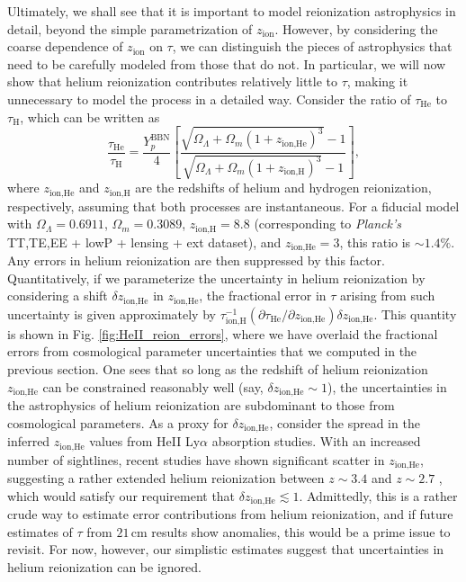 \documentclass[twocolumn,aps,prd,nofootinbib,showpacs,superscriptaddress]{revtex4-1}
\begin{document}
Ultimately, we shall see that it is important to model reionization astrophysics in detail, beyond the simple parametrization of $z_\textrm{ion}$. However, by considering the coarse dependence of $z_\textrm{ion}$ on $\tau$, we can distinguish the pieces of astrophysics that need to be carefully modeled from those that do not. In particular, we will now show that helium reionization contributes relatively little to $\tau$, making it unnecessary to model the process in a detailed way. Consider the ratio of $\tau_\textrm{He}$ to $\tau_\textrm{H}$, which can be written as
\begin{equation}
\frac{\tau_\textrm{He}}{\tau_\textrm{H}} = \frac{Y_p^\textrm{BBN}}{4} \left[ \frac{ \sqrt{\Omega_\Lambda + \Omega_m (1+z_\textrm{ion,He})^3} - 1}{ \sqrt{\Omega_\Lambda + \Omega_m (1+z_\textrm{ion,H})^3} - 1}\right],
\end{equation}
where $z_\textrm{ion,He}$ and $z_\textrm{ion,H}$ are the redshifts of helium and hydrogen reionization, respectively, assuming that both processes are instantaneous. For a fiducial model with $\Omega_\Lambda = 0.6911$, $\Omega_m = 0.3089$, $z_\textrm{ion,H} = 8.8$ (corresponding to \emph{Planck's} TT,TE,EE + lowP + lensing + ext dataset), and $z_\textrm{ion,He} = 3$, this ratio is $\sim 1.4\%$. Any errors in helium reionization are then suppressed by this factor. Quantitatively, if we parameterize the uncertainty in helium reionization by considering a shift $\delta z_\textrm{ion,He}$ in $z_\textrm{ion,He}$, the fractional error in $\tau$ arising from such uncertainty is given approximately by $\tau_\textrm{ion,H}^{-1} (\partial \tau_\textrm{He} / \partial z_\textrm{ion,He}) \delta z_\textrm{ion,He}$. This quantity is shown in Fig. \ref{fig:HeII_reion_errors}, where we have overlaid the fractional errors from cosmological parameter uncertainties that we computed in the previous section. One sees that so long as the redshift of helium reionization $z_\textrm{ion,He}$ can be constrained reasonably well (say, $ \delta z_\textrm{ion,He} \sim 1$), the uncertainties in the astrophysics of helium reionization are subdominant to those from cosmological parameters. As a proxy for $ \delta z_\textrm{ion,He} $, consider the spread in the inferred $z_\textrm{ion,He}$ values from HeII Ly$\alpha$ absorption studies. With an increased number of sightlines, recent studies have shown significant scatter in $z_\textrm{ion,He}$, suggesting a rather extended helium reionization between $z \sim 3.4$ and $z \sim 2.7$ \cite{worseck_et_al2014}, which would satisfy our requirement that $ \delta z_\textrm{ion,He} \lesssim 1$. Admittedly, this is a rather crude way to estimate error contributions from helium reionization, and if future estimates of $\tau$ from $21\,\textrm{cm}$ results show anomalies, this would be a prime issue to revisit. For now, however, our simplistic estimates suggest that uncertainties in helium reionization can be ignored.
\end{document}
